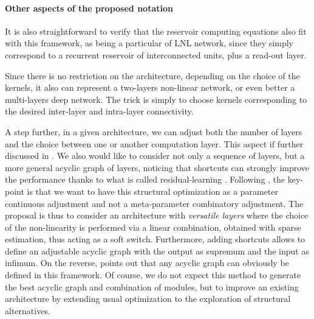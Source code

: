 \paragraph{Other aspects of the proposed notation} 

It is also straightforward to verify that the reservoir computing equations \cite{verstraeten-etal:07} also fit with this framework, as being a particular of LNL network, since they simply correspond to a recurrent reservoir of interconnected units, plus a read-out layer.

Since there is no restriction on the architecture, depending on the choice of the kernels, it also can represent a two-layers non-linear network, or even better a multi-layers deep network. The trick is simply to choose kernels corresponding to the desired inter-layer and intra-layer connectivity.

A step further, in a given architecture, we can adjust both the number of layers and the choice between one or another computation layer. This aspect if further discussed in \cite{Drumond2017From}. We also would like to consider not only a sequence of layers, but a more general acyclic graph of layers, noticing that shortcuts can strongly improve the performance thanks to what is called residual-learning \cite{He2016Deep}. Following \cite{Fdrumond2017}, the key-point is that we want to have this structural optimization as a parameter continuous adjustment and not a meta-parameter combinatory adjustment. The proposal is thus to consider an architecture with {\em versatile layers} where the choice of the non-linearity is performed via a linear combination, obtained with sparse estimation, thus acting as a soft switch. Furthermore, adding shortcuts allows to define an adjustable acyclic graph with the output as supremum and the input as infimum. On the reverse, \cite{Fdrumond2017} points out that any acyclic graph can obviously be defined in this framework. Of course, we do not expect this method to generate the best acyclic graph and combination of modules, but to improve an existing architecture by extending usual optimization to the exploration of structural alternatives.

